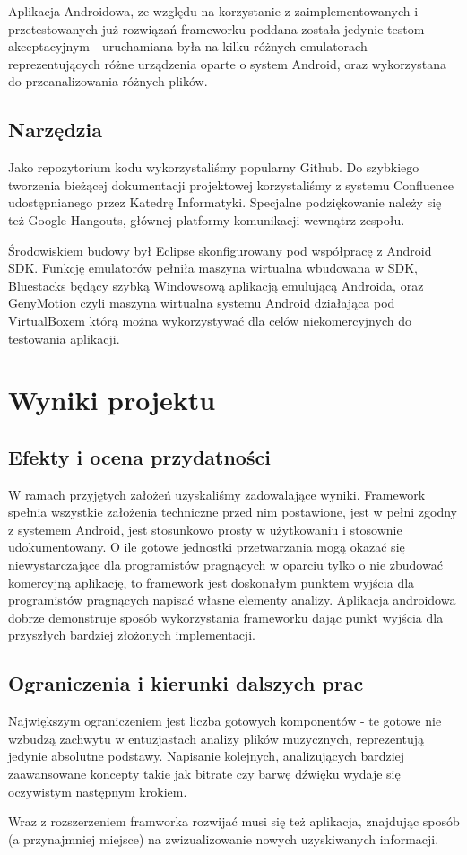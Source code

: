 Aplikacja Androidowa, ze względu na korzystanie z zaimplementowanych i przetestowanych już rozwiązań frameworku poddana została jedynie testom akceptacyjnym - uruchamiana była na kilku różnych emulatorach reprezentujących różne urządzenia oparte o system Android, oraz wykorzystana do przeanalizowania różnych plików.
\section{Narzędzia}
Jako repozytorium kodu wykorzystaliśmy popularny Github. Do szybkiego tworzenia bieżącej dokumentacji projektowej korzystaliśmy z systemu Confluence udostępnianego przez Katedrę Informatyki. Specjalne podziękowanie należy się też Google Hangouts, głównej platformy komunikacji wewnątrz zespołu.

Środowiskiem budowy był Eclipse skonfigurowany pod współpracę z Android SDK. Funkcję emulatorów pełniła maszyna wirtualna wbudowana w SDK, Bluestacks będący szybką Windowsową aplikacją emulującą Androida, oraz GenyMotion czyli maszyna wirtualna systemu Android działająca pod VirtualBoxem którą można wykorzystywać dla celów niekomercyjnych do testowania aplikacji.

\chapter{Wyniki projektu}
\section{Efekty i ocena przydatności}
W ramach przyjętych założeń uzyskaliśmy zadowalające wyniki. Framework spełnia wszystkie założenia techniczne przed nim postawione, jest w pełni zgodny z systemem Android, jest stosunkowo prosty w użytkowaniu i stosownie udokumentowany. O ile gotowe jednostki przetwarzania mogą okazać się niewystarczające dla programistów pragnących w oparciu tylko o nie zbudować komercyjną aplikację, to framework jest doskonałym punktem wyjścia dla programistów pragnących napisać własne elementy analizy. Aplikacja androidowa dobrze demonstruje sposób wykorzystania frameworku dając punkt wyjścia dla przyszłych bardziej złożonych implementacji.

\section{Ograniczenia i kierunki dalszych prac}
Największym ograniczeniem jest liczba gotowych komponentów - te gotowe nie wzbudzą zachwytu w entuzjastach analizy plików muzycznych, reprezentują jedynie absolutne podstawy. Napisanie kolejnych, analizujących bardziej zaawansowane koncepty takie jak bitrate czy barwę dźwięku wydaje się oczywistym następnym krokiem.

Wraz z rozszerzeniem framworka rozwijać musi się też aplikacja, znajdując sposób (a przynajmniej miejsce) na zwizualizowanie nowych uzyskiwanych informacji.

\nocite{*}

